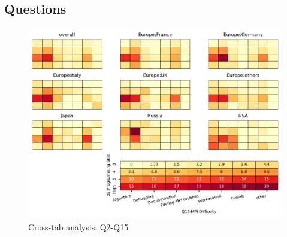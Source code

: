
\subsection{Questions}


\begin{figure}
\begin{center}
\includegraphics[width=12cm]{../pdfs/Q2-Q15.pdf}
\caption{Cross-tab analysis: Q2-Q15}
\label{fig:Q2-Q15}
\end{center}
\end{figure}
